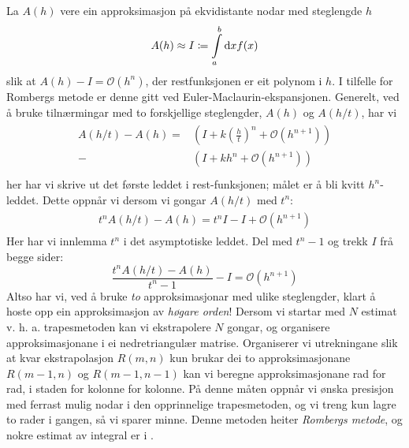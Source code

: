 \documentclass[12pt]{article}
\begin{document}
\begin{multicols}{2}
    La $A(h)$ vere ein approksimasjon på ekvidistante nodar med steglengde $h$
    \[
        A(h) \approx I \coloneqq \int\limits_a^b \mathrm{d}{x} f(x)
    \]
    slik at $A(h) - I = \mathscr O(h^{n})$, der restfunksjonen er eit polynom i $h$.
    I tilfelle for Rombergs metode er denne gitt ved Euler-Maclaurin-ekspansjonen.
    Generelt, ved å bruke tilnærmingar med to forskjellige steglengder,
    $A(h)$ og $A(h/t)$, har vi
    \begin{align*}
        \begin{split}
            A(h/t) - A(h) =& \left(I + k\left(\frac h t\right)^n + \mathscr O\left(h^{n+1}\right)\right)\\
            -& \left(I + kh^n + \mathscr O\left(h^{n+1}\right)\right) \\
        \end{split}
    \end{align*}
    her har vi skrive ut det første leddet i rest-funksjonen;
    målet er å bli kvitt $h^n$-leddet.
    Dette oppnår vi dersom vi gongar $A(h/t)$ med $t^n$:
    \begin{align*}
        \begin{split}
            t^nA(h/t) - A(h) = t^nI - I + \mathscr O \left(h^{n+1}\right)
        \end{split}
    \end{align*}
    Her har vi innlemma $t^n$ i det asymptotiske leddet.
    Del med $t^n - 1$ og trekk $I$ frå begge sider:
    \begin{equation}
        \frac{t^nA(h/t) - A(h)}{t^n - 1} - I = \mathscr O \left(h^{n+1}\right)
    \end{equation}
    Altso har vi, ved å bruke {\em to} approksimasjonar med ulike steglengder,
    klart å hoste opp ein approksimasjon av {\em høgare orden}!
    Dersom vi startar med $N$ estimat v. h. a. trapesmetoden
    kan vi ekstrapolere $N$ gongar, og organisere approksimasjonane
    i ei nedretriangulær matrise.
    Organiserer vi utrekningane slik at kvar ekstrapolasjon $R(m, n)$ kun brukar
    dei to approksimasjonane $R(m-1, n)$ og $R(m-1,n-1)$ kan vi beregne
    approksimasjonane rad for rad, i staden for kolonne for kolonne.
    På denne måten oppnår vi ønska presisjon med ferrast mulig nodar
    i den opprinnelige trapesmetoden,
    og vi treng kun lagre to rader i gangen, så vi sparer minne.
    Denne metoden heiter {\em Rombergs metode},
    og nokre estimat av integral er i .


\end{multicols}
\end{document}
